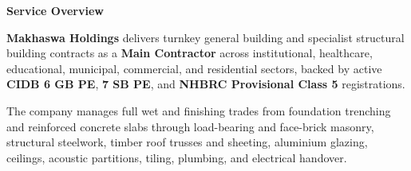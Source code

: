 \documentclass[a4paper,11pt]{article}
\begin{document}
\noindent
\begin{minipage}[t]{0.63\textwidth}
    \vspace{0pt}
    {\large\bfseries\color{mhnavy} Service Overview}
    \vspace{0.08cm}

    {\fontsize{8.7pt}{12.3pt}\selectfont\color{mhtext}
    \textbf{Makhaswa Holdings} delivers turnkey general building and specialist structural building contracts as a \textbf{Main Contractor} across institutional, healthcare, educational, municipal, commercial, and residential sectors, backed by active \textbf{CIDB 6 GB PE}, \textbf{7 SB PE}, and \textbf{NHBRC Provisional Class 5} registrations.
    }

    \vspace{0.15cm}

    {\fontsize{8.7pt}{12.3pt}\selectfont\color{mhtext}
    The company manages full wet and finishing trades from foundation trenching and reinforced concrete slabs through load-bearing and face-brick masonry, structural steelwork, timber roof trusses and sheeting, aluminium glazing, ceilings, acoustic partitions, tiling, plumbing, and electrical handover.
    }
\end{minipage}
\hfill
\end{document}
